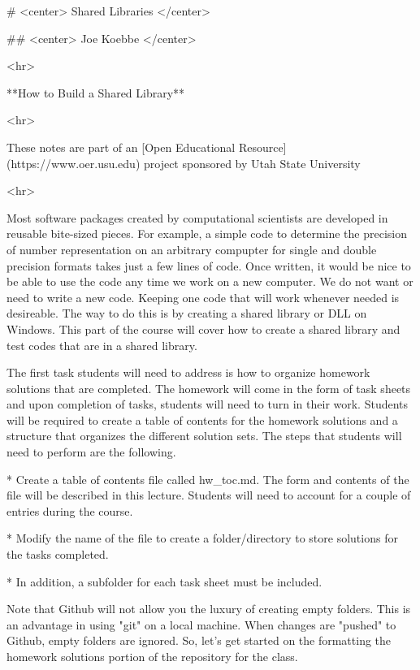 # <center> Shared Libraries </center>

## <center> Joe Koebbe </center>

<hr>

**How to Build a Shared Library**

<hr>

  These notes are part of an
  [Open Educational Resource](https://www.oer.usu.edu)
  project sponsored by Utah State University

<hr>

Most software packages created by computational scientists are developed in
reusable bite-sized pieces. For example, a simple code to determine the
precision of number representation on an arbitrary compupter for single and
double precision formats takes just a few lines of code. Once written, it would
be nice to be able to use the code any time we work on a new computer. We do not
want or need to write a new code. Keeping one code that will work whenever
needed is desireable. The way to do this is by creating a shared library or DLL
on Windows. This part of the course will cover how to create a shared library
and test codes that are in a shared library.







The first task students will need to address is how to organize homework
solutions that are completed. The homework will come in the form of task sheets
and upon completion of tasks, students will need to turn in their work. Students
will be required to create a table of contents for the homework solutions and a
structure that organizes the different solution sets. The steps that students
will need to perform are the following.

  * Create a table of contents file called hw_toc.md. The form and contents of
    the file will be described in this lecture. Students will need to account
    for a couple of entries during the course.

  * Modify the name of the file to create a folder/directory to store solutions
    for the tasks completed.

  * In addition, a subfolder for each task sheet must be included.

Note that Github will not allow you the luxury of creating empty folders. This
is an advantage in using "git" on a local machine. When changes are "pushed" to
Github, empty folders are ignored. So, let's get started on the formatting the
homework solutions portion of the repository for the class.

